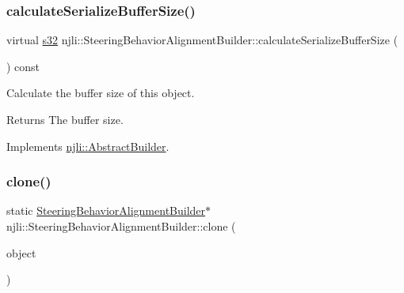 \mbox{\label{classnjli_1_1_steering_behavior_alignment_builder_a709481f46937533d73b1a0246ea76993}} 
\subsubsection{\texorpdfstring{calculate\+Serialize\+Buffer\+Size()}{calculateSerializeBufferSize()}}
{\footnotesize\ttfamily virtual \mbox{\hyperlink{_util_8h_aa62c75d314a0d1f37f79c4b73b2292e2}{s32}} njli\+::\+Steering\+Behavior\+Alignment\+Builder\+::calculate\+Serialize\+Buffer\+Size (\begin{DoxyParamCaption}{ }\end{DoxyParamCaption}) const\hspace{0.3cm}{\ttfamily [virtual]}}

Calculate the buffer size of this object.

\begin{DoxyReturn}{Returns}
The buffer size. 
\end{DoxyReturn}


Implements \mbox{\hyperlink{classnjli_1_1_abstract_builder_aa1d220053e182c37b31b427499c6eacf}{njli\+::\+Abstract\+Builder}}.

\mbox{\label{classnjli_1_1_steering_behavior_alignment_builder_aee302479b172e0dffe63b095f2f28d2d}} 
\subsubsection{\texorpdfstring{clone()}{clone()}}
{\footnotesize\ttfamily static \mbox{\hyperlink{classnjli_1_1_steering_behavior_alignment_builder}{Steering\+Behavior\+Alignment\+Builder}}$\ast$ njli\+::\+Steering\+Behavior\+Alignment\+Builder\+::clone (\begin{DoxyParamCaption}\item[{const \mbox{\hyperlink{classnjli_1_1_steering_behavior_alignment_builder}{Steering\+Behavior\+Alignment\+Builder}} \&}]{object }\end{DoxyParamCaption})\hspace{0.3cm}{\ttfamily [static]}}

